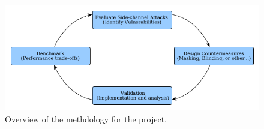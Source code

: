 \documentclass[11pt, a4paper]{article}
\begin{document}
\begin{figure}
\begin{center}



\includegraphics[scale=0.4]{cycle.png}
\caption{Overview of the methdology for the project.}
\end{center}


\end{figure}



\end{document}
